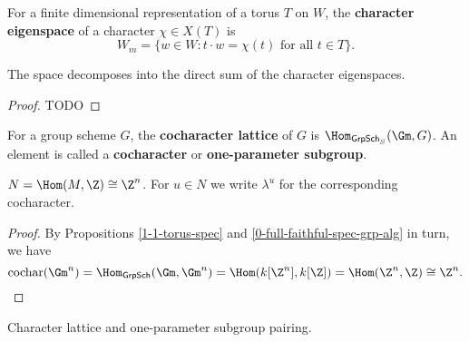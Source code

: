 \begin{definition}
  \label{1-1-char-eigenspace}

  For a finite dimensional representation of a torus $T$ on $W$, the {\bf character eigenspace} of a character $\chi \in X(T)$ is
  \[
    W_m = \{w\in W : t\cdot w = \chi(t)\text{ for all } t\in T \}.
  \]
\end{definition}


\begin{proposition}
  \label{1-1-2-char-eigenspace-direct-sum}

  The space decomposes into the direct sum of the character eigenspaces.
\end{proposition}
\begin{proof}
  \uses{}

  TODO
\end{proof}

\begin{definition}
  \label{1-1-cochar}
  \leanok

  For a group scheme $G$, the {\bf cocharacter lattice} of $G$ is $\Hom_{\mathsf{GrpSch}_S}(\Gm, G)$.
  An element is called a {\bf cocharacter} or {\bf one-parameter subgroup}.
\end{definition}

\begin{proposition}
  \label{1-1-cochar-torus}

  $N = \Hom(M, \Z) \cong \Z^n$. For $u \in N$ we write $\lambda^u$ for the corresponding cocharacter.
\end{proposition}
\begin{proof}

  By Propositions \ref{1-1-torus-spec} and \ref{0-full-faithful-spec-grp-alg} in turn, we have
  \[
    \mathrm{cochar}(\Gm^n) = \Hom_{\mathsf{GrpSch}}(\Gm, \Gm^n) = \Hom(k[\Z^n], k[\Z]) = \Hom(\Z^n, \Z) \cong \Z^n.
  \]
\end{proof}

\begin{definition}
  \label{1-1-char-cochar-pairing}
  \leanok

  Character lattice and one-parameter subgroup pairing.
\end{definition}


